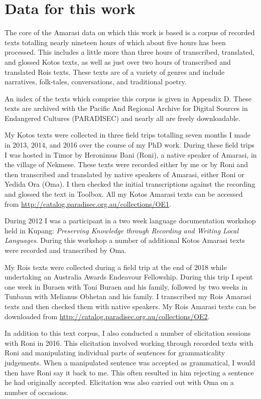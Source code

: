 \section{Data for this work}\label{sec:Meth}
The core of the Amarasi data on which this work is based
is a corpus of recorded texts totalling nearly nineteen hours
of which about five hours has been processed.
This includes a little more than three hours of
transcribed, translated, and glossed Kotos texts,
as well as just over two hours of transcribed and translated Ro{\Q}is texts.
These texts are of a variety of genres and include narratives, folk-tales,
conversations, and traditional poetry.

An index of the texts which comprise this corpus is given in Appendix
D.
These texts are archived with the
Pacific And Regional Archive for Digital Sources in Endangered Cultures (PARADISEC)
and nearly all are freely downloadable.

My Kotos texts were collected in three
field trips totalling seven months I made
in 2013, 2014, and 2016 over the course of my PhD work.
During these field trips I was hosted in Timor by
Heronimus Bani (Roni), a native speaker of Amarasi, in the village of Nekmese{\Q}.
These texts were recorded either by me or by Roni
and then transcribed and translated by native speakers of Amarasi, either Roni or Yedida Ora (Oma).
I then checked the initial transcriptions against the recording and glossed the text in Toolbox.
All my Kotos Amarasi texts can be accessed
from \url{http://catalog.paradisec.org.au/collections/OE1}.

During 2012 I was a participant in a two week
language documentation workshop held in Kupang:
\emph{Preserving Knowledge through Recording and Writing Local Languages}.
During this workshop a number of additional Kotos Amarasi
texts were recorded and transcribed by Oma.

My Ro{\Q}is texts were collected during a
field trip at the end of 2018
while undertaking an Australia Awards Endeavour Fellowship.
During this trip I spent one week in Buraen
with Toni Buraen and his family, followed by
two weeks in Tunbaun with Melianus Obhetan and his family.
I transcribed my Ro{\Q}is Amarasi texts
and then checked them with native speakers.
My Ro{\Q}is Amarasi texts can be downloaded from
\url{http://catalog.paradisec.org.au/collections/OE2}.

In addition to this text corpus, I also conducted a number of
elicitation sessions with Roni in 2016.
This elicitation involved working through recorded texts with Roni
and manipulating individual parts of sentences for grammaticality judgements.
When a manipulated sentence was accepted as grammatical,
I would then have Roni say it back to me.
This often resulted in him rejecting a sentence he had originally accepted.
Elicitation was also carried out with Oma on a number of occasions.

